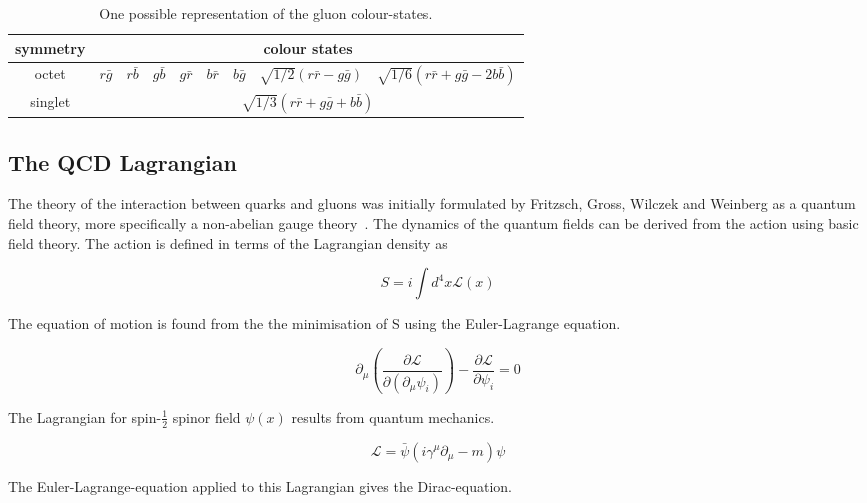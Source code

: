 \begin{table}[htb]
\centering
\begin{tabular}{c c c c c c c c c } \toprule
symmetry & \multicolumn{8}{c}{colour states} \\ \midrule
octet & $r \bar g$ & $r \bar b$ & $g \bar b$ & $g \bar r$ & $b \bar r$ & $b \bar g$ & $\sqrt{1/2} (r \bar r - g \bar g) $ & $\sqrt{1/6}(r \bar r + g \bar g - 2 b\bar b)$\\ 
singlet & \multicolumn{8}{c}{$\sqrt{1/3}(r \bar r + g \bar g + b \bar b)$}\\ \bottomrule
\end{tabular}
\caption[One possible representation of the gluon colour-states]{One possible representation of the gluon colour-states.}
\end{table}


\subsection{The QCD Lagrangian}

The theory of the interaction between quarks and gluons was initially formulated by Fritzsch, Gross, Wilczek and Weinberg as a quantum field theory, more specifically a non-abelian gauge theory~\cite{Weinberg:1973un, Fritzsch:1973pi, Gross:1973ju}. The dynamics of the quantum fields can be derived from the action using basic field theory. The action is defined in terms of the Lagrangian density as

\begin{equation}
S = i \int d^4 x \mathcal{L}(x)
\end{equation}

The equation of motion is found from the the minimisation of S using the Euler-Lagrange equation.

\begin{equation}
\partial_\mu \left( \frac{\partial \mathcal{L}}{\partial(\partial_\mu \psi_i)} \right) - \frac{\partial \mathcal{L}}{\partial \psi_i} = 0
\end{equation}

The Lagrangian for spin-$\frac{1}{2}$ spinor field $\psi(x)$ results from quantum mechanics. 

\begin{equation}
\mathcal{L} = \bar \psi (i\gamma^\mu \partial_\mu -m) \psi
\end{equation}

The Euler-Lagrange-equation applied to this Lagrangian gives the Dirac-equation.

